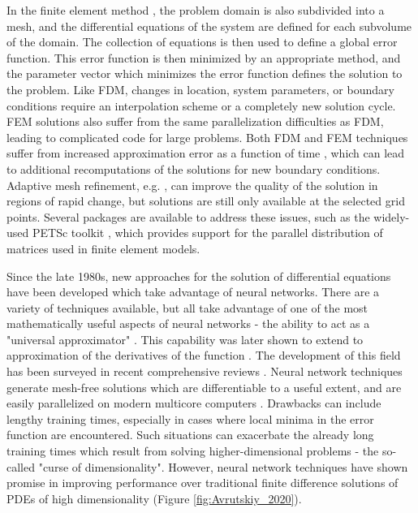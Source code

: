 \documentclass{article}
\begin{document}
In the finite element method \cite{DeVries2011}, the problem domain is also subdivided into a mesh, and the differential equations of the system are defined for each subvolume of the domain. The collection of equations is then used to define a global error function. This error function is then minimized by an appropriate method, and the parameter vector which minimizes the error function defines the solution to the problem. Like FDM, changes in location, system parameters, or boundary conditions require an interpolation scheme or a completely new solution cycle. FEM solutions also suffer from the same parallelization difficulties as FDM, leading to complicated code for large problems. Both FDM and FEM techniques suffer from increased approximation error as a function of time \cite{Carnahan1969}, which can lead to additional recomputations of the solutions for new boundary conditions. Adaptive mesh refinement, e.g. \cite{Berger1989}, can improve the quality of the solution in regions of rapid change, but solutions are still only available at the selected grid points. Several packages are available to address these issues, such as the widely-used PETSc toolkit \cite{petsc}, which provides support for the parallel distribution of matrices used in finite element models.

Since the late 1980s, new approaches for the solution of differential equations have been developed which take advantage of neural networks. There are a variety of techniques available, but all take advantage of one of the most mathematically useful aspects of neural networks - the ability to act as a "universal approximator" \cite{Hornik1989}. This capability was later shown to extend to approximation of the derivatives of the function \cite{Hornik1990}. The development of this field has been surveyed in recent comprehensive reviews \cite{Yadav2015,Chakraverty2017}. Neural network techniques generate mesh-free solutions which are differentiable to a useful extent, and are easily parallelized on modern multicore computers \cite{Schuessler2011}. Drawbacks can include lengthy training times, especially in cases where local minima in the error function are encountered. Such situations can exacerbate the already long training times which result from solving higher-dimensional problems - the so-called "curse of dimensionality". However, neural network techniques have shown promise in improving performance over traditional finite difference solutions of PDEs of high dimensionality (Figure \ref{fig:Avrutskiy_2020}).
\end{document}
